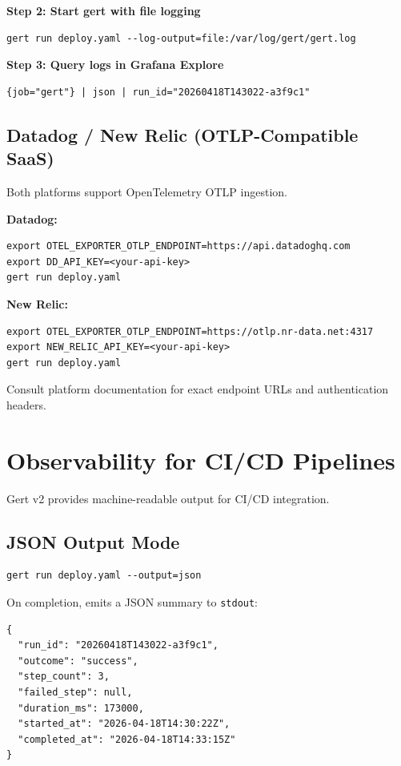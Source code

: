 \textbf{Step 2: Start gert with file logging}
\begin{verbatim}
gert run deploy.yaml --log-output=file:/var/log/gert/gert.log
\end{verbatim}

\textbf{Step 3: Query logs in Grafana Explore}
\begin{verbatim}
{job="gert"} | json | run_id="20260418T143022-a3f9c1"
\end{verbatim}

\subsection{Datadog / New Relic (OTLP-Compatible SaaS)}

Both platforms support OpenTelemetry OTLP ingestion.

\textbf{Datadog:}
\begin{verbatim}
export OTEL_EXPORTER_OTLP_ENDPOINT=https://api.datadoghq.com
export DD_API_KEY=<your-api-key>
gert run deploy.yaml
\end{verbatim}

\textbf{New Relic:}
\begin{verbatim}
export OTEL_EXPORTER_OTLP_ENDPOINT=https://otlp.nr-data.net:4317
export NEW_RELIC_API_KEY=<your-api-key>
gert run deploy.yaml
\end{verbatim}

Consult platform documentation for exact endpoint URLs and authentication headers.

\section{Observability for CI/CD Pipelines}

Gert v2 provides machine-readable output for CI/CD integration.

\subsection{JSON Output Mode}

\begin{verbatim}
gert run deploy.yaml --output=json
\end{verbatim}

On completion, emits a JSON summary to \texttt{stdout}:

\begin{verbatim}
{
  "run_id": "20260418T143022-a3f9c1",
  "outcome": "success",
  "step_count": 3,
  "failed_step": null,
  "duration_ms": 173000,
  "started_at": "2026-04-18T14:30:22Z",
  "completed_at": "2026-04-18T14:33:15Z"
}
\end{verbatim}

